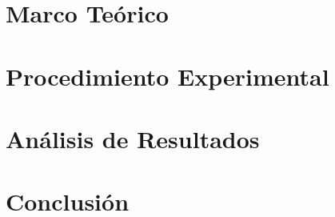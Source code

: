 \documentclass{article}
\begin{document}
    \section{Marco Teórico}\label{sec:marco-teórico}



    \section{Procedimiento Experimental}\label{sec:procedimiento-experimental}


    \section{Análisis de Resultados}\label{sec:análisis-de-resultados}



    \section{Conclusión}\label{sec:conclusion}



    \printbibliography
\end{document}
